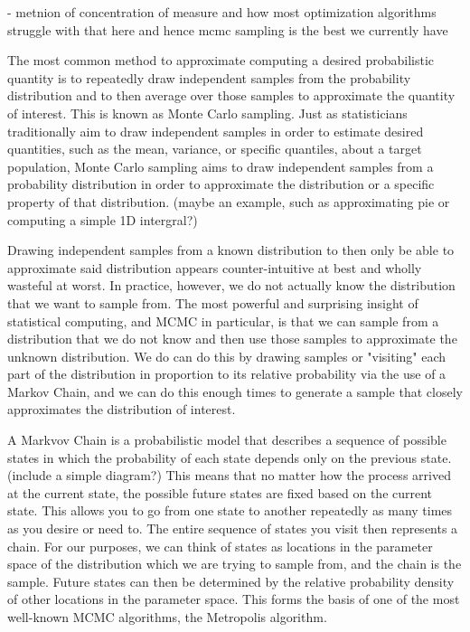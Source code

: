 - metnion of concentration of measure and how most optimization algorithms struggle with that here and hence mcmc sampling is the best we currently have

The most common method to approximate computing a desired probabilistic quantity is to repeatedly draw independent samples from the probability distribution and to then average over those samples to approximate the quantity of interest. This is known as Monte Carlo sampling.  Just as statisticians traditionally aim to draw independent samples in order to estimate desired quantities, such as the mean, variance, or specific quantiles, about a target population, Monte Carlo sampling aims to draw independent samples from a probability distribution in order to approximate the distribution or a specific property of that distribution. (maybe an example, such as approximating pie or computing a simple 1D intergral?)

Drawing independent samples from a known distribution to then only be able to approximate said distribution appears counter-intuitive at best and wholly wasteful at worst. In practice, however, we do not actually know the distribution that we want to sample from. The most powerful and surprising insight of statistical computing, and MCMC in particular, is that we can sample from a distribution that we do not know and then use those samples to approximate the unknown distribution. We do can do this by drawing samples or "visiting" each part of the distribution in proportion to its relative probability via the use of a Markov Chain, and we can do this enough times to generate a sample that closely approximates the distribution of interest.

A Markvov Chain is a probabilistic model that describes a sequence of possible states in which the probability of each state depends only on the previous state. (include a simple diagram?) This means that no matter how the process arrived at the current state, the possible future states are fixed based on the current state. This allows you to go from one state to another repeatedly as many times as you desire or need to. The entire sequence of states you visit then represents a chain. For our purposes, we can think of states as locations in the parameter space of the distribution which we are trying to sample from, and the chain is the sample. Future states can then be determined by the relative probability density of other locations in the parameter space. This forms the basis of one of the most well-known MCMC algorithms, the Metropolis algorithm.

